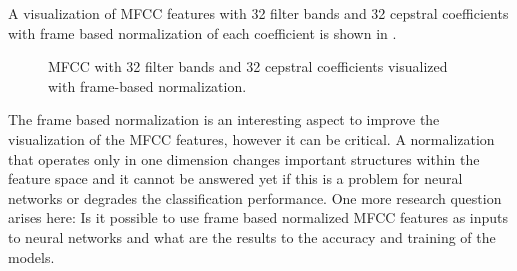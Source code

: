 A visualization of MFCC features with 32 filter bands and 32 cepstral coefficients with frame based normalization of each coefficient is shown in .
\begin{figure}[!ht]
  \centering
  \caption{MFCC with 32 filter bands and 32 cepstral coefficients visualized with frame-based normalization.}
  \label{fig:signal_mfcc_showcase_mfcc32}
\end{figure}
\FloatBarrier
\noindent
The frame based normalization is an interesting aspect to improve the visualization of the MFCC features, however it can be critical. 
A normalization that operates only in one dimension changes important structures within the feature space and it cannot be answered yet if this is a problem for neural networks or degrades the classification performance.
One more research question arises here: Is it possible to use frame based normalized MFCC features as inputs to neural networks and what are the results to the accuracy and training of the models.


